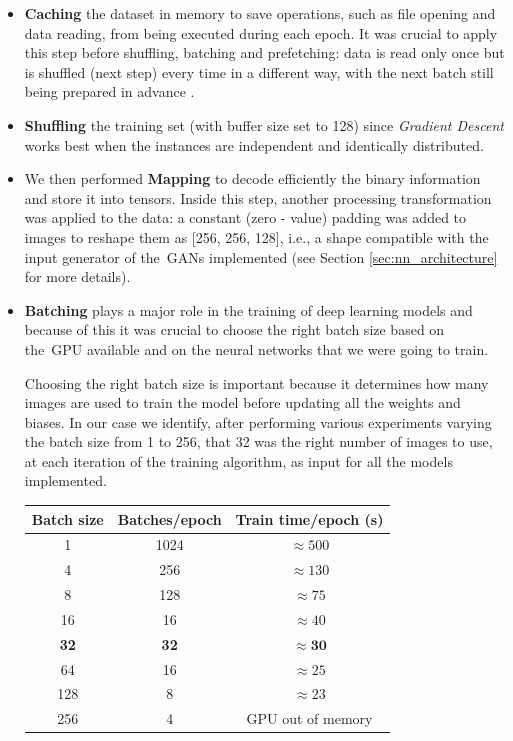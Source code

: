 \begin{itemize}
\item \textbf{Caching} the dataset in memory to save operations, such as file opening and data reading, from being executed during each epoch. It was crucial to apply this step before shuffling, batching and prefetching: data is read only once but is shuffled (next step) every time in a different way, with the next batch still being prepared in advance \cite[p.~915]{hands_on_ml}.
\item \textbf{Shuffling} the training set (with buffer size set to 128) since \textit{Gradient Descent} works best when the instances are independent and identically distributed.
\item We then performed \textbf{Mapping} to decode efficiently the binary information and store it into tensors. Inside this step, another processing transformation was applied to the data: a constant (zero - value) padding was added to images to reshape them as [256, 256, 128], i.e., a shape compatible with the input generator of the~\ac{GAN}s implemented (see Section \ref{sec:nn_architecture} for more details). 
\item \textbf{Batching} plays a major role in the training of deep learning models and because of this it was crucial to choose the right batch size based on the~\ac{GPU} available and on the neural networks that we were going to train. 

Choosing the right batch size is important because it determines how many images are used to train the model before updating all the weights and biases. In our case we identify, after performing various experiments varying the batch size from 1 to 256, that 32 was the right number of images to use, at each iteration of the training algorithm, as input for all the models implemented.

\vspace{2mm} %
\begin{table}[htbp!]
\centering
\begin{tabular}{ccc}
\toprule
Batch size & Batches/epoch & Train time/epoch (s)\\
\midrule
1 & 1024 & $\approx500$\\
4 & 256 & $\approx130$\\
8 & 128 & $\approx75$\\
16 & 16 & $\approx40$\\
\textbf{32} & \textbf{32} & $\mathbf{\approx30}$\\
64 & 16 & $\approx25$\\
128 & 8 & $\approx23$\\
256 & 4 & GPU out of memory\\


\end{tabular}
\end{table}
\end{itemize}
